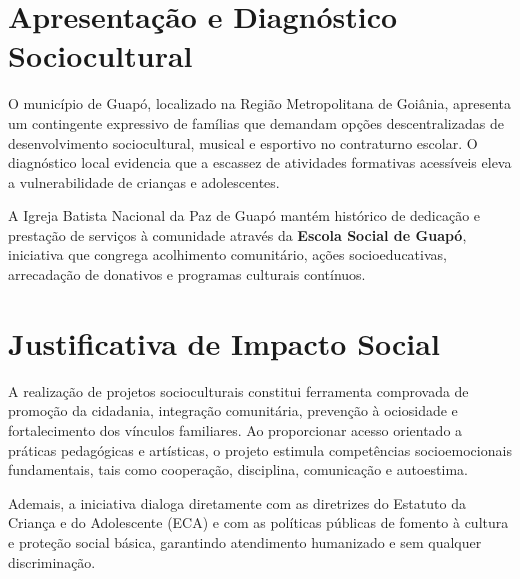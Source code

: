 \documentclass[12pt,a4paper]{article}
\begin{document}
\vspace{0.3cm}

\section{Apresentação e Diagnóstico Sociocultural}

O município de Guapó, localizado na Região Metropolitana de Goiânia, apresenta um contingente expressivo de famílias que demandam opções descentralizadas de desenvolvimento sociocultural, musical e esportivo no contraturno escolar. O diagnóstico local evidencia que a escassez de atividades formativas acessíveis eleva a vulnerabilidade de crianças e adolescentes.

A Igreja Batista Nacional da Paz de Guapó mantém histórico de dedicação e prestação de serviços à comunidade através da \textbf{Escola Social de Guapó}, iniciativa que congrega acolhimento comunitário, ações socioeducativas, arrecadação de donativos e programas culturais contínuos.


\vspace{0.3cm}

\section{Justificativa de Impacto Social}

A realização de projetos socioculturais constitui ferramenta comprovada de promoção da cidadania, integração comunitária, prevenção à ociosidade e fortalecimento dos vínculos familiares. Ao proporcionar acesso orientado a práticas pedagógicas e artísticas, o projeto estimula competências socioemocionais fundamentais, tais como cooperação, disciplina, comunicação e autoestima.

Ademais, a iniciativa dialoga diretamente com as diretrizes do Estatuto da Criança e do Adolescente (ECA) e com as políticas públicas de fomento à cultura e proteção social básica, garantindo atendimento humanizado e sem qualquer discriminação.
\end{document}
